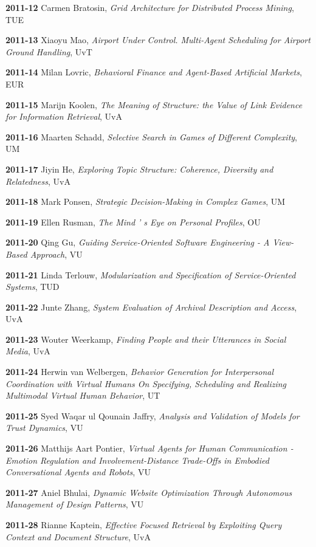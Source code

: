 \begin{multicols}{2}
\textbf{2011-12}   Carmen Bratosin, \textit{Grid Architecture for Distributed Process Mining}, TUE

\textbf{2011-13}   Xiaoyu Mao, \textit{Airport Under Control. Multi-Agent Scheduling for Airport Ground Handling}, UvT

\textbf{2011-14}   Milan Lovric, \textit{Behavioral Finance and Agent-Based Artificial Markets}, EUR

\textbf{2011-15}   Marijn Koolen, \textit {The Meaning of Structure: the Value of Link Evidence for Information Retrieval}, UvA

\textbf{2011-16}   Maarten Schadd, \textit{Selective Search in  Games of Different Complexity}, UM

\textbf{2011-17}   Jiyin He, \textit{Exploring Topic Structure: Coherence, Diversity and Relatedness}, UvA

\textbf{2011-18}   Mark Ponsen, \textit{Strategic Decision-Making in Complex Games}, UM

\textbf{2011-19}   Ellen Rusman, \textit{The Mind ' s Eye on Personal Profiles}, OU

\textbf{2011-20}   Qing Gu, \textit{Guiding Service-Oriented Software Engineering - A View-Based Approach}, VU

\textbf{2011-21}   Linda Terlouw, \textit{Modularization and Specification of Service-Oriented Systems}, TUD

\textbf{2011-22}   Junte Zhang, \textit{System Evaluation of Archival Description and Access}, UvA

\textbf{2011-23}   Wouter Weerkamp, \textit{Finding People and their Utterances in Social Media}, UvA

\textbf{2011-24}   Herwin van Welbergen, \textit{Behavior Generation for Interpersonal Coordination with Virtual Humans On Specifying, Scheduling and Realizing Multimodal Virtual Human Behavior}, UT

\textbf{2011-25}   Syed Waqar ul Qounain Jaffry, \textit{Analysis and Validation of Models for Trust Dynamics}, VU

\textbf{2011-26}   Matthijs Aart Pontier, \textit{Virtual Agents for Human Communication - Emotion Regulation and Involvement-Distance Trade-Offs in Embodied Conversational Agents and Robots}, VU

\textbf{2011-27}   Aniel Bhulai, \textit{Dynamic Website Optimization Through Autonomous Management of Design Patterns}, VU

\textbf{2011-28}   Rianne Kaptein, \textit{Effective Focused Retrieval by Exploiting Query Context and Document Structure}, UvA


\end{multicols}
